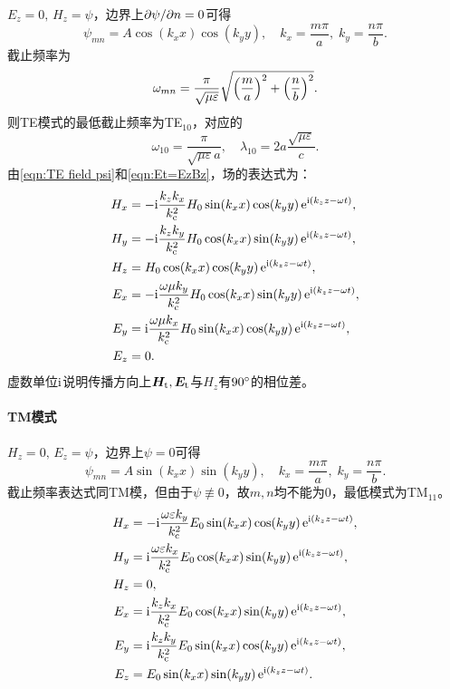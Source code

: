 $E_z=0,\,H_z=\psi$，边界上$\partial\psi/\partial n=0$可得
\begin{equation}
    \psi_{mn}=A\cos(k_xx)\cos(k_yy),\quad k_x=\frac{m\pi}a,\;k_y=\frac{n\pi}b.
\end{equation}
截止频率为
\begin{equation}
    \omega_{mn}=\frac\pi{\sqrt{\mu\varepsilon}}\sqrt{\Bigl(\frac ma\Bigr)^2+\Bigl(\frac nb\Bigr)^2}.
\end{equation}
则TE模式的最低截止频率为TE$_{10}$，对应的
\[
    \omega_{10}=\frac\pi{\sqrt{\mu\varepsilon}a},\quad\lambda_{10}=2a\frac{\sqrt{\mu\varepsilon}}c.
\]
由\eqref{eqn:TE field psi}和\eqref{eqn:Et=EzBz}，场的表达式为：
\begin{subequations}
    \begin{align}
        H_x&=-\mathrm{i}\frac{k_zk_x}{k_\text c^2}H_0\sin(k_xx)\cos(k_yy)\mathop{}\!\mathrm{e}^{\mathrm{i}(k_zz-\omega t)},\\
        H_y&=-\mathrm{i}\frac{k_zk_y}{k_\text c^2}H_0\cos(k_xx)\sin(k_yy)\mathop{}\!\mathrm{e}^{\mathrm{i}(k_zz-\omega t)},\\
        H_z&=H_0\cos(k_xx)\cos(k_yy)\mathop{}\!\mathrm{e}^{\mathrm{i}(k_zz-\omega t)},\\
        E_x&=-\mathrm{i}\frac{\omega\mu k_y}{k_\text c^2}H_0\cos(k_xx)\sin(k_yy)\mathop{}\!\mathrm{e}^{\mathrm{i}(k_zz-\omega t)},\\
        E_y&=\mathrm{i}\frac{\omega\mu k_x}{k_\text c^2}H_0\sin(k_xx)\cos(k_yy)\mathop{}\!\mathrm{e}^{\mathrm{i}(k_zz-\omega t)},\\
        E_z&=0.
    \end{align}
\end{subequations}
虚数单位$\mathrm{i}$说明传播方向上$\bm H_\text t,\bm E_\text t$与$H_z$有$90^\circ$的相位差。

\paragraph{TM模式}
$H_z=0,\,E_z=\psi$，边界上$\psi=0$可得
\begin{equation}
    \psi_{mn}=A\sin(k_xx)\sin(k_yy),\quad k_x=\frac{m\pi}a,\;k_y=\frac{n\pi}b.
\end{equation}
截止频率表达式同TM模，但由于$\psi\not\equiv 0$，故$m,n$均不能为0，最低模式为TM$_{11}$。
\begin{subequations}
    \begin{align}
        H_x&=-\mathrm{i}\frac{\omega\varepsilon k_y}{k_\text c^2}E_0\sin(k_xx)\cos(k_yy)\mathop{}\!\mathrm{e}^{\mathrm{i}(k_zz-\omega t)},\\
        H_y&=\mathrm{i}\frac{\omega\varepsilon k_x}{k_\text c^2}E_0\cos(k_xx)\sin(k_yy)\mathop{}\!\mathrm{e}^{\mathrm{i}(k_zz-\omega t)},\\
        H_z&=0,\\
        E_x&=\mathrm{i}\frac{k_zk_x}{k_\text c^2}E_0\cos(k_xx)\sin(k_yy)\mathop{}\!\mathrm{e}^{\mathrm{i}(k_zz-\omega t)},\\
        E_y&=\mathrm{i}\frac{k_zk_y}{k_\text c^2}E_0\sin(k_xx)\cos(k_yy)\mathop{}\!\mathrm{e}^{\mathrm{i}(k_zz-\omega t)},\\
        E_z&=E_0\sin(k_xx)\sin(k_yy)\mathop{}\!\mathrm{e}^{\mathrm{i}(k_zz-\omega t)}.
    \end{align}
\end{subequations}

